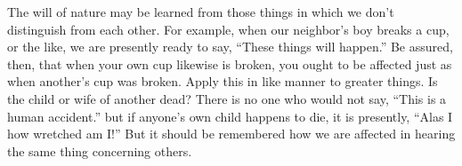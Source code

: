 The will of nature may be learned from those things in which we
don't distinguish from each other. For example, when our neighbor's
boy breaks a cup, or the like, we are presently ready to say, ``These
things will happen.'' Be assured, then, that when your own cup likewise
is broken, you ought to be affected just as when another's cup was
broken. Apply this in like manner to greater things. Is the child
or wife of another dead? There is no one who would not say, ``This
is a human accident.'' but if anyone's own child happens to die, it
is presently, ``Alas I how wretched am I!'' But it should be remembered
how we are affected in hearing the same thing concerning others.
